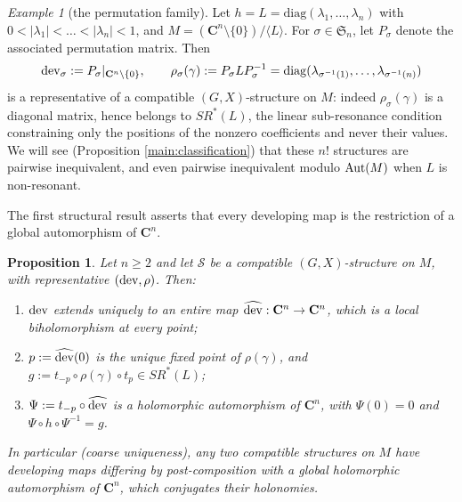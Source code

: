 \documentclass[english,11pt]{amsart}
\newtheorem{proposition}[theorem]{Proposition}
\theoremstyle{definition}
\theoremstyle{remark}
\newtheorem{example}[theorem]{Example}
\numberwithin{equation}{section}
\newcommand{\C}{\mathbf{C}}
\newcommand{\Aut}{\mathop{\rm Aut}}
\newcommand{\dev}{\mathop{\rm dev}\nolimits}
\newcommand{\Sc}{\mathcal{S}}
\begin{document}
\begin{example}[the permutation family]\label{ex:permutations}
Let $h=L=\mathrm{diag}(\lambda_1,\dots,\lambda_n)$ with $0<|\lambda_1|<\dots<|\lambda_n|<1$, and $M=(\C^n\setminus\{0\})/\langle L\rangle$. For $\sigma\in\mathfrak{S}_n$, let $P_\sigma$ denote the associated permutation matrix. Then
\[
\dev\nolimits_\sigma:=P_\sigma|_{\C^n\setminus\{0\}},\qquad
\rho_\sigma(\gamma):=P_\sigma L P_\sigma^{-1}=\mathrm{diag}(\lambda_{\sigma^{-1}(1)},\dots,\lambda_{\sigma^{-1}(n)})
\]
is a representative of a compatible $(G,X)$-structure on $M$: indeed $\rho_\sigma(\gamma)$ is a diagonal matrix, hence belongs to $SR^*(L)$, the linear sub-resonance condition constraining only the positions of the nonzero coefficients and never their values. We will see (Proposition \ref{main:classification}) that these $n!$ structures are pairwise inequivalent, and even pairwise inequivalent modulo $\Aut(M)$ when $L$ is non-resonant.
\end{example}

The first structural result asserts that every developing map is the restriction of a global automorphism of $\C^n$.

\begin{proposition}\label{main:rigidity}
Let $n\geq 2$ and let $\Sc$ be a compatible $(G,X)$-structure on $M$, with representative $(\dev,\rho)$. Then:
\begin{enumerate}
\item $\dev$ extends uniquely to an entire map $\widehat{\dev}:\C^n\to\C^n$, which is a local biholomorphism at every point;
\item $p:=\widehat{\dev}(0)$ is the unique fixed point of $\rho(\gamma)$, and $g:=t_{-p}\circ\rho(\gamma)\circ t_{p}\in SR^*(L)$;
\item $\Psi:=t_{-p}\circ\widehat{\dev}$ is a holomorphic automorphism of $\C^n$, with $\Psi(0)=0$ and $\Psi\circ h\circ\Psi^{-1}=g$.
\end{enumerate}
In particular \textup{(}coarse uniqueness\textup{)}, any two compatible structures on $M$ have developing maps differing by post-composition with a global holomorphic automorphism of $\C^n$, which conjugates their holonomies.
\end{proposition}
\end{document}
